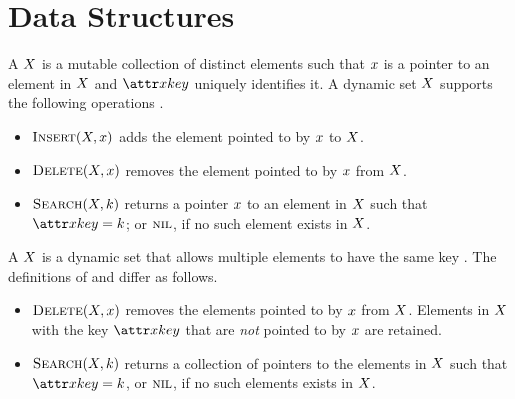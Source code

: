 \chapter{Data Structures}\label{ch:data-structures}

A  $X$ is a mutable collection of distinct elements such that $x$ is a pointer to an element in $X$ and $\aSomeElementKey$ uniquely identifies it. A dynamic set $X$ supports the following operations \citep{Cormen2022}.
\begin{itemize}
  \item $\cInsert[\vSomeSet, \vSomeElement]$ adds the element pointed to by $x$ to $X$.
  \item $\cDelete[\vSomeSet, \vSomeElement]$ removes the element pointed to by $x$ from $X$.
  \item $\cSearch[\vSomeSet, \vKey]$ returns a pointer $x$ to an element in $X$ such that $\aSomeElementKey \equals \vKey$; or $\textsc{nil}$, if no such element exists in $X$.
\end{itemize}

A  $X$ is a dynamic set that allows multiple elements to have the same key \citep{Cormen2022}. The definitions of \cDelete and \cSearch differ as follows.
\begin{itemize}
  \item $\cDelete[\vSomeSet, \vSomeElement]$ removes the elements pointed to by $x$ from $X$. Elements in $X$ with the key $\aSomeElementKey$ that are \emph{not} pointed to by $x$ are retained.
  \item $\cSearch[\vSomeSet, \vKey]$ returns a collection of pointers to the elements in $X$ such that $\aSomeElementKey \equals \vKey$, or $\textsc{nil}$, if no such elements exists in $X$.
\end{itemize}